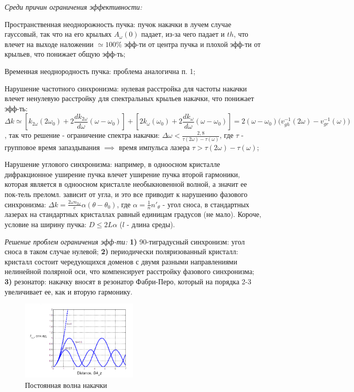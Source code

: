 \textit{Среди причин ограничения эффективности:}
\begin{enumerate*}
    \item Пространственная неоднорожность пучка:
    пучок накачки в лучем случае гауссовый, так что на его крыльях $A_{\omega}(0)$ падает, из-за чего падает и $th$, что влечет на выходе наложении $\simeq 100\%$ эфф-ти от центра пучка и плохой эфф-ти от крыльев, что понижает общую эфф-ть; 
    \item  Временная неоднородность пучка: 
    проблема аналогична п. 1; 
    \item Нарушение частотного синхронизма: 
    нулевая расстройка для частоты накачки влечет ненулевую расстройку для спектральных крыльев накачки, что понижает эфф-ть:
    \begin{equation*}
        \Delta k \simeq [k_{2\omega}(2\omega_{0})+2\frac{dk_{2\omega}}{d\omega}(\omega-\omega_{0})]+[2k_{\omega}(\omega_{0})+2\frac{dk_{\omega}}{d\omega}(\omega-\omega_{0})] = 2(\omega-\omega_{0}) \big( v_{gh}^{-1}(2\omega) - v_{gr}^{-1}(\omega) \big)
    \end{equation*}, так что решение - ограничение спектра накачки: $\Delta \omega < \frac{2,8}{\tau (2\omega) - \tau (\omega)}$, где $\tau$ - групповое время запаздывания $\implies$ время импульса лазера $\tau > \tau(2\omega)-\tau(\omega)$;  
    \item Нарушение углового синхронизма: 
    например, в одноосном кристалле дифракционное уширение пучка влечет уширение пучка второй гармоники, которая является в одноосном кристалле необыкновенной волной, а значит ее пок-тель преломл. зависит от угла, и это все приводит к нарушению фазового синхронизма: $\Delta k = \frac{2\omega n_{2\omega}}{c}\alpha (\theta - \theta_{0})$, где $\alpha = \frac{1}{n}n'_{\theta}$ - угол сноса, в стандартных лазерах на стандартных кристаллах равный единицам градусов (не мало). Короче, условие на ширину пучка: $D \leq 2L \alpha$ ($l$ - длина среды).
\end{enumerate*}


\textit{Решение проблем ограничения эфф-ти:} \textbf{1)} 90-тиградусный синхронизм: угол сноса в таком случае нулевой; \textbf{2)} периодически поляризованный кристалл: кристалл состоит чередующихся доменов с двумя разными направлениями нелинейной полярной оси, что компенсирует расстройку фазового синхронизма; \textbf{3)} резонатор: накачку вносят в резонатор Фабри-Перо, который на порядка 2-3 увеличивает ее, как и вторую гармонику.


\begin{figure}[ht]
    \centering
    \includegraphics[width=0.5\textwidth]{figures/4_2.png}
    \caption{Постоянная волна накачки}
\end{figure}
